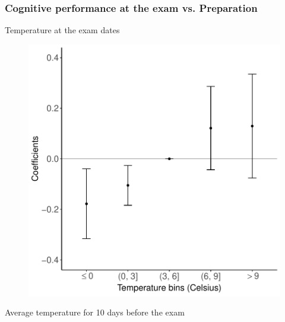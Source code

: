 \documentclass[10pt, pdfmx,hiresbb]{beamer}
\begin{document}
\begin{frame}\frametitle{Cognitive performance at the exam vs. Preparation}
  \begin{minipage}{0.49\textwidth}
    \begin{center}
      Temperature at the exam dates
    \end{center}
    \begin{figure}[h]
      \centering
      \includegraphics[width = \textwidth]{../Output/images/reg_pre10_exam_4.pdf}
    \end{figure}
  \end{minipage}
  \begin{minipage}{0.49\textwidth}
    \begin{center}
      Average temperature for 10 days before the exam
    \end{center}
    \begin{figure}[h]

\end{figure}
\end{minipage}
\end{frame}
\end{document}
